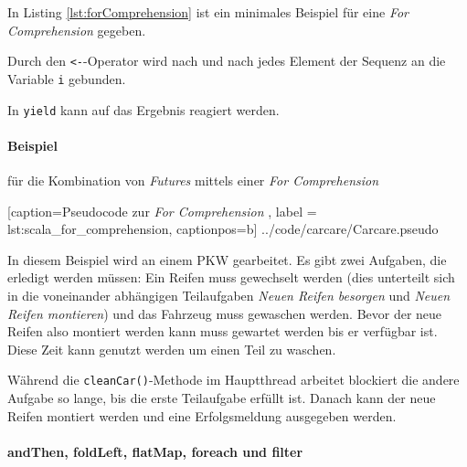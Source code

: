 In Listing \ref{lst:forComprehension} ist ein minimales Beispiel für
eine \emph{For Comprehension} gegeben.

Durch den \texttt{<-}-Operator wird nach und nach jedes Element
der Sequenz an die Variable \texttt{i} gebunden.

In \texttt{yield} kann auf das Ergebnis reagiert werden.

\paragraph{Beispiel} für die Kombination von \emph{Futures} mittels
einer \emph{For Comprehension}


    [caption={Pseudocode zur \emph{For Comprehension} },
       label = lst:scala_for_comprehension,
       captionpos=b]
 {../code/carcare/Carcare.pseudo}
 
In diesem Beispiel wird an einem PKW gearbeitet. Es gibt zwei
Aufgaben, die erledigt werden müssen: Ein Reifen muss gewechselt werden
(dies unterteilt sich in die voneinander abhängigen Teilaufgaben
\emph{Neuen Reifen besorgen} und \emph{Neuen Reifen montieren}) und
das Fahrzeug muss gewaschen werden. Bevor der neue Reifen also montiert
werden kann muss gewartet werden bis er verfügbar ist. Diese Zeit
kann genutzt werden um einen Teil zu waschen.

Während die \texttt{cleanCar()}-Methode im Hauptthread arbeitet
blockiert die andere Aufgabe so lange, bis die erste Teilaufgabe
erfüllt ist. Danach kann der neue Reifen montiert werden und
eine Erfolgsmeldung ausgegeben werden.

\paragraph{andThen, foldLeft, flatMap, foreach und filter}
